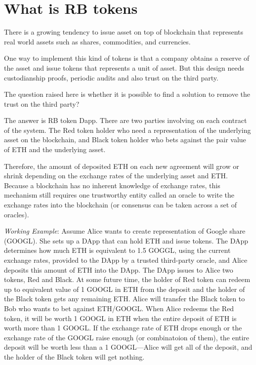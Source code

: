 



\section{What is RB tokens}

There is a growing tendency to issue asset on top of blockchain that represents  real world assets such as shares, commodities, and currencies. 

One way to implement this kind of tokens is that a company obtains a reserve of the asset and issue tokens that represents a unit of asset. But this design needs custodianship proofs, periodic audits and also trust on the third party.

The question raised here is whether it is possible to find a solution to remove the trust on the third party?

The answer is RB token Dapp. There are two parties involving on each contract of the system. The Red token holder who need a representation of the underlying asset on the blockchain, and Black token holder who bets against the pair value of ETH and the underlying asset.

Therefore, the amount of deposited ETH on each new agreement will grow or shrink depending on the exchange rates of the underlying asset and ETH. Because a blockchain has no inherent knowledge of exchange rates, this mechanism still requires one trustworthy entity called an oracle to write the exchange rates into the blockchain (or consensus can be taken across a set of oracles).

\emph{Working Example}: Assume Alice wants to create representation of Google share (GOOGL). She sets up a DApp that can hold ETH and issue tokens. The DApp determines how much ETH is equivalent to 1.5 GOGGL, using the current exchange rates, provided to the DApp by a trusted third-party oracle, and Alice deposits this amount of ETH into the DApp. The DApp issues to Alice two tokens, Red and Black. At some future time, the holder of Red token can redeem up to equivalent value of 1 GOOGL in ETH from the deposit and the holder of the Black token gets any remaining ETH. Alice will transfer the Black token to Bob who wants to bet against ETH/GOOGL. When Alice redeems the Red token, it will be worth 1 GOOGL in ETH when the entire deposit of ETH is worth more than 1 GOOGL. If the exchange rate of ETH drops enough or the exchange rate of the GOOGL raise enough (or combinatoion of them), the entire deposit will be worth less than a 1 GOOGL—Alice will get all of the deposit, and the holder of the Black token will get nothing.

